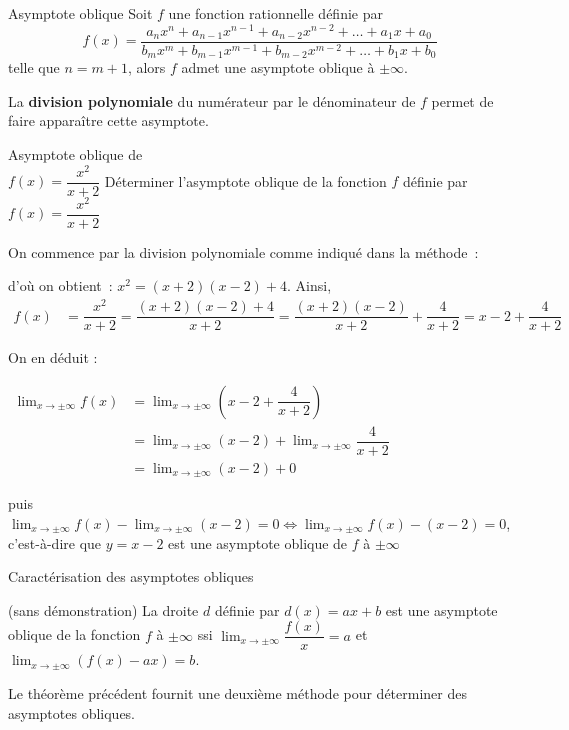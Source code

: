 \documentclass[a4paper,12pt]{article}
\begin{document}
\begin{methode}
Asymptote oblique
\tcblower
Soit $f$ une fonction rationnelle définie par
\[
f(x) = \dfrac{a_n x^n + a_{n-1} x^{n-1} + a_{n-2} x^{n-2} + \ldots + a_1 x + a_0}{b_m x^m + b_{m-1} x^{m-1} + b_{m-2} x^{m-2} + \ldots + b_1 x + b_0}
\]
telle que $n = m + 1$, alors $f$ admet une asymptote oblique à $\pm\infty$.

La \textbf{division polynomiale} du numérateur par le dénominateur de $f$ permet de faire apparaître cette asymptote.
\end{methode}

\begin{exemple}
	Asymptote oblique de\\
	\medskip
	$f(x)=\dfrac{x^2}{x+2}$
	\tcblower
Déterminer l'asymptote oblique de la fonction $f$ définie par $f(x) = \dfrac{x^2}{x + 2}$
\smallskip

On commence par la division polynomiale comme indiqué dans la méthode~:
\begin{center}
\end{center}
d'où on obtient~: $x^2 = (x + 2)(x - 2) + 4$.
Ainsi, 
\begin{align*}
f(x) &= \dfrac{x^2}{x + 2} = \dfrac{(x + 2)(x - 2) + 4}{x + 2} = \dfrac{(x + 2)(x - 2)}{x + 2} + \dfrac{4}{x + 2}= x - 2 + \dfrac{4}{x + 2}
\end{align*}

On en déduit :

$
\begin{aligned}
	\displaystyle\lim_{x \to \pm\infty} f(x) &= \displaystyle\lim_{x \to \pm\infty} \left( x - 2 + \dfrac{4}{x + 2} \right)\\
&= \displaystyle\lim_{x \to \pm\infty} (x - 2) + \displaystyle\lim_{x \to \pm\infty} \dfrac{4}{x + 2}\\
&= \displaystyle\lim_{x \to \pm\infty} (x - 2) + 0
\end{aligned}
$
\medskip

puis $\displaystyle\lim_{x \to \pm\infty} f(x) - \displaystyle\lim_{x \to \pm\infty} (x-2) = 0 \Leftrightarrow \displaystyle\lim_{x \to \pm\infty} f(x) - (x-2) = 0$, c'est-à-dire que $y = x-2$ est une asymptote oblique de $f$ à $\pm\infty$
\end{exemple}

\begin{thm}[label=thm:obli]
	Caractérisation des asymptotes obliques

	(sans démonstration)
	\tcblower
La droite $d$ définie par $d(x) = ax + b$ est une asymptote oblique de la fonction $f$ à $\pm\infty$ ssi $\displaystyle\lim_{x \to \pm\infty} \dfrac{f(x)}{x} = a$ et $\displaystyle\lim_{x \to \pm\infty} (f(x) - ax) = b$.
\end{thm}
\begin{remarque}
	\tcblower
	Le théorème précédent fournit une deuxième méthode pour déterminer des asymptotes obliques.
\end{remarque}
\end{document}
